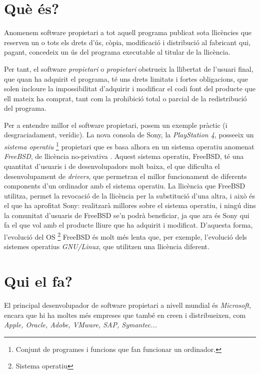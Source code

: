 \section{Què és?}

	Anomenem software propietari a tot aquell programa publicat sota llicències
	que reserven un o tots els drets d'ús, còpia, modificació i distribució
	al fabricant qui, pagant, concedeix un ús del programa executable al titular
	de la llicència.

	Per tant, el software \emph{propietari} o \emph{propietari} obstrueix la llibertat
	de l'usuari final, que quan ha adquirit el programa, té uns drets limitats i fortes
	obligacions, que solen incloure la impossibilitat d'adquirir i modificar el codi font del producte
	que ell mateix ha comprat, tant com la prohibició total o parcial de la redistribució del programa.
	\cite{gnucategories}

	Per a entendre millor el software propietari, posem un exemple pràctic (i desgraciadament, verídic).
	La nova consola de Sony, la \emph{PlayStation 4}, posseeix un \emph{sistema operatiu} \footnote{Conjunt
	de programes i funcions que fan funcionar un ordinador.} propietari que es basa alhora en un sistema operatiu
	anomenat \emph{FreeBSD}, de llicència no-privativa \cite{freebsdlicense}. Aquest sistema operatiu, FreeBSD, té una
	quantitat d'usuaris i de desenvolupadors molt baixa, el que dificulta el desenvolupament de \emph{drivers}, que
	permetran el millor funcionament de diferents components d'un ordinador amb el sistema operatiu. La llicència que FreeBSD utilitza, permet
	la revocació de la llicència per la substitució d'una altra, i això és el que ha aprofitat Sony: realitzarà millores
	sobre el sistema operatiu, i ningú dins la comunitat d'usuaris de FreeBSD se'n podrà beneficiar, ja que ara és Sony qui
	fa el que vol amb el producte lliure que ha adquirit i modificat. D'aquesta forma, l'evolució del OS \footnote{Sistema operatiu}
	FreeBSD és molt més lenta que, per exemple, l'evolució dels sistemes operatius \emph{GNU/Linux}, que utilitzen
	una llicència diferent. \cite{wowbsd}

\section{Qui el fa?}

	El principal desenvolupador de software propietari a nivell mundial és \emph{Microsoft}, encara que hi
	ha moltes més empreses que també en creen i distribueixen, com \emph{Apple, Oracle, Adobe, VMware,
	SAP, Symantec...} \cite{propietariempreses}


